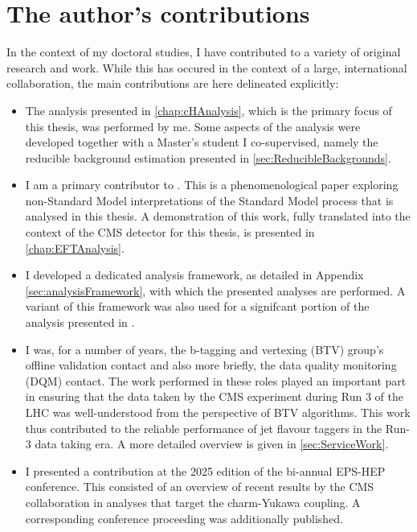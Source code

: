 \documentclass[a4paper]{book}
\begin{document}
\chapter{The author's contributions}
In the context of my doctoral studies, I have contributed to a variety of original research and work. While this has occured in the context of a large, international collaboration, the main contributions are here delineated explicitly:
\begin{itemize}
  \item The analysis presented in \autoref{chap:cHAnalysis}, which is the primary focus of this thesis, was performed by me. Some aspects of the analysis were developed together with a Master's student I co-supervised, namely the reducible background estimation presented in \autoref{sec:ReducibleBackgrounds}.
  \item I am a primary contributor to \cite{PhenoPaper}. This is a phenomenological paper exploring non-Standard Model interpretations of the Standard Model process that is analysed in this thesis. A demonstration of this work, fully translated into the context of the CMS detector for this thesis, is presented in \autoref{chap:EFTAnalysis}.
  \item I developed a dedicated analysis framework, as detailed in Appendix \autoref{sec:analysisFramework}, with which the presented analyses are performed. A variant of this framework was also used for a signifcant portion of the analysis presented in \cite{PhenoPaper}. 
  \item I was, for a number of years, the b-tagging and vertexing (BTV) group's offline validation contact and also more briefly, the data quality monitoring (DQM) contact. The work performed in these roles played an important part in ensuring that the data taken by the CMS experiment during Run 3 of the LHC was well-understood from the perspective of BTV algorithms. This work thus contributed to the reliable performance of jet flavour taggers in the Run-3 data taking era. A more detailed overview is given in \autoref{sec:ServiceWork}.
  \item I presented a contribution at the 2025 edition of the bi-annual EPS-HEP conference. This consisted of an overview of recent results by the CMS collaboration in analyses that target the charm-Yukawa coupling. A corresponding conference proceeding was additionally published.
\end{itemize}
\end{document}
